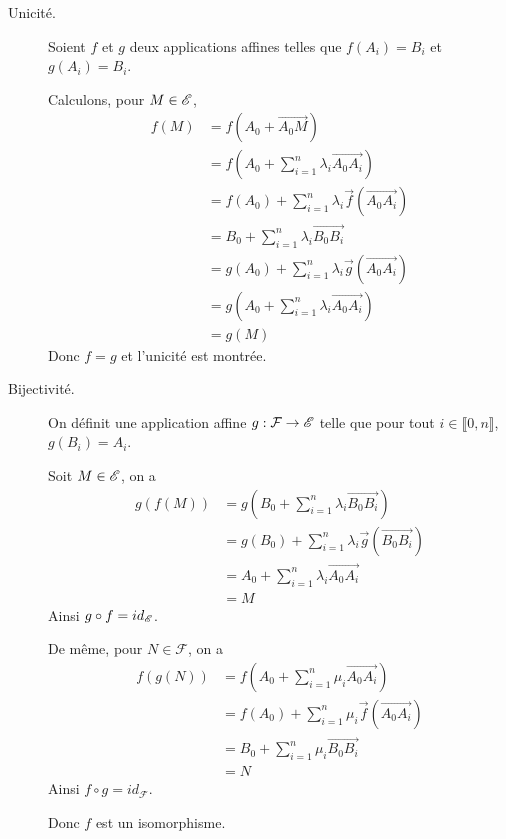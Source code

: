 \documentclass[a4paper,12pt]{article}
\begin{document}
\begin{demonstration}
    \begin{description}
        \item[Unicité.] 
        Soient $f$ et $g$ deux applications affines telles que $f(A_i) = B_i$ et $g(A_i) = B_i$.
        
        Calculons, pour $M \in \mathscr{E}$,
        \begin{align*}
            f(M) &= f(A_0 + \overrightarrow{A_0 M}) \\
            &= f\left(A_0 + \sum_{i=1}^n \lambda_i \overrightarrow{A_0 A_i}\right) \\
            &= f(A_0) + \sum_{i=1}^n \lambda_i \vec{f}(\overrightarrow{A_0 A_i}) \\
            &= B_0 + \sum_{i=1}^n \lambda_i \overrightarrow{B_0 B_i} \\
            &= g(A_0) + \sum_{i=1}^n \lambda_i \vec{g}(\overrightarrow{A_0 A_i}) \\
            &= g\left(A_0 + \sum_{i=1}^n \lambda_i \overrightarrow{A_0 A_i}\right) \\
            &= g(M)
        \end{align*}
        Donc $f = g$ et l'unicité est montrée.

        \item[Bijectivité.]
        On définit une application affine $g: \mathcal{F} \to \mathscr{E}$ telle que pour tout $i \in \llbracket 0, n \rrbracket$, $g(B_i) = A_i$.
        
        Soit $M \in \mathscr{E}$, on a
        \begin{align*}
            g(f(M)) &= g\left(B_0 + \sum_{i=1}^n \lambda_i \overrightarrow{B_0 B_i}\right) \\
            &= g(B_0) + \sum_{i=1}^n \lambda_i \vec{g}(\overrightarrow{B_0 B_i}) \\
            &= A_0 + \sum_{i=1}^n \lambda_i \overrightarrow{A_0 A_i} \\
            &= M
        \end{align*}
        Ainsi $g \circ f = id_{\mathscr{E}}$.

        De même, pour $N \in \mathcal{F}$, on a
        \begin{align*}
            f(g(N)) &= f\left(A_0 + \sum_{i=1}^n \mu_i \overrightarrow{A_0 A_i}\right) \\
            &= f(A_0) + \sum_{i=1}^n \mu_i \vec{f}(\overrightarrow{A_0 A_i}) \\
            &= B_0 + \sum_{i=1}^n \mu_i \overrightarrow{B_0 B_i} \\
            &= N
        \end{align*}
        Ainsi $f \circ g = id_{\mathcal{F}}$.

        Donc $f$ est un isomorphisme.
\end{description}
\end{demonstration}
\end{document}
